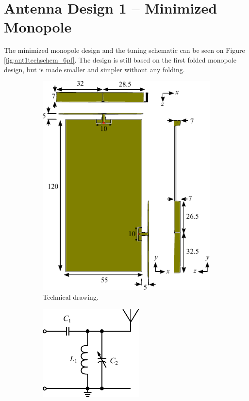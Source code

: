 \section{Antenna Design 1 -- Minimized Monopole}
\label{sec:techsol1_monopole_5mm}

The minimized monopole design and the tuning schematic can be seen on Figure \ref{fig:ant1techschem_6pf}. The design is still based on the first folded monopole design, but is made smaller and simpler without any folding.

\begin{figure}[htbp]
    \begin{subfigure}[b]{0.49\linewidth}
        \centering
        \includegraphics{img/tech_sol/monopole/5mm/3d_drawing/3d_drawing}
        \caption{Technical drawing.}
        \label{fig:ant1technical_6pf}
    \end{subfigure}
    \hfill
    \begin{subfigure}[b]{0.49\linewidth}
        \centering
        \includegraphics{img/tech_sol/schematic_tuning_1}\\[1cm]

\end{subfigure}
\end{figure}
